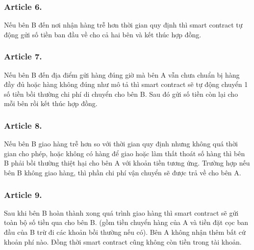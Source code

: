 \subsubsection*{Article 6.}
Nếu bên B đến nơi nhận hàng trễ hơn thời gian quy định thì smart contract tự động gửi số tiền ban đầu về cho cả hai bên và kết thúc hợp đồng.

\subsubsection*{Article 7.}
Nếu bên B đến địa điểm gửi hàng đúng giờ mà bên A vẫn chưa chuẩn bị hàng đầy đủ hoặc hàng không đúng như mô tả thì smart contract sẽ tự động chuyển 1 số tiền bồi thường chi phí di chuyển cho bên B. Sau đó gửi số tiền còn lại cho mỗi bên rồi kết thúc hợp đồng.

\subsubsection*{Article 8.}
Nếu bên B giao hàng trễ hơn so với thời gian quy định nhưng không quá thời gian cho phép, hoặc không có hàng để giao hoặc làm thất thoát số hàng thì bên B phải bồi thường thiệt hại cho bên A với khoản tiền tương ứng. Trường hợp nếu bên B không giao hàng, thì phần chi phí vận chuyển sẽ được trả về cho bên A. 

\subsubsection*{Article 9.}
Sau khi bên B hoàn thành xong quá trình giao hàng thì smart contract sẽ gửi toàn bộ số tiền qua cho bên B. (gồm tiền chuyển hàng của A và tiền đặt cọc ban đầu của B trừ đi các khoản bồi thường nếu có). Bên A không nhận thêm bất cứ khoản phí nào. Đồng thời smart contract cũng không còn tiền trong tài khoản.